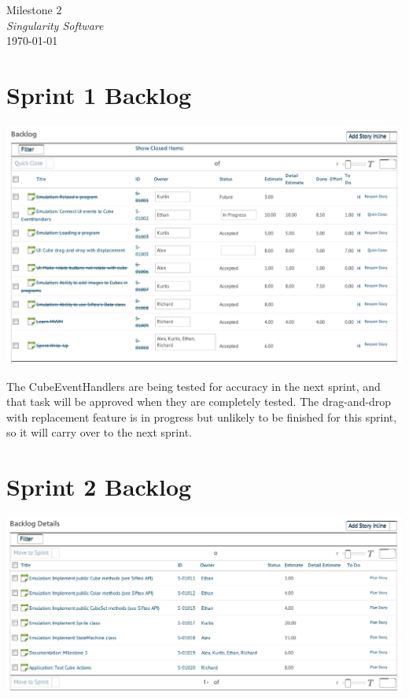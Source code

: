 \documentclass[12pt]{article}
\begin{document}
\begin{center}
	\LARGE{Milestone 2} \\
	\Large{\textit{Singularity Software}} \\
	\vspace{.05in}
	\normalsize{\today} \\
\end{center}

\section*{Sprint 1 Backlog}
\includegraphics[scale=.63]{pdfs/MS2VersionOne/OldSprintBacklog_cropped.pdf}

The CubeEventHandlers are being tested for accuracy in the next sprint, and that task will be approved when they are completely tested. The drag-and-drop with replacement feature is in progress but unlikely to be finished for this sprint, so it will carry over to the next sprint.

\clearpage

\section*{Sprint 2 Backlog}
\includegraphics[scale=.63]{pdfs/MS2VersionOne/NewSprintBacklog_cropped.pdf}
\end{document}
